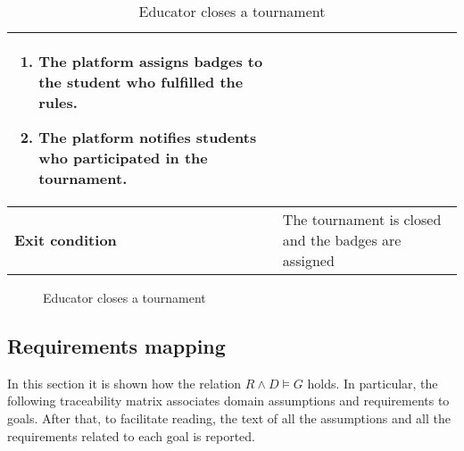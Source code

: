 \begin{enumerate}[label=\textbf{UC\arabic*}:,ref=UC\arabic*,leftmargin=1.3cm]
{\begin{table}[H]
\begin{tabular}{|l|p{11.9cm}|}
\begin{enumerate}[label=\arabic*.]
                              \item The platform assigns badges to the student who fulfilled the rules.
                              \item The platform notifies students who participated in the tournament.
                        \end{enumerate} \\\hline
                        \textbf{Exit condition}  & The tournament is closed and the badges are assigned       \\\hline
                  \end{tabular}
                  \caption{Educator closes a tournament   }
                  \label{table:Educator closes a tournament   }
            \end{table}
            \begin{figure}[H]
                  \centering
                  \caption{Educator closes a tournament   }
                  \label{fig:Educator closes a tournament   }
            \end{figure}
      }
\end{enumerate}
\subsection{Requirements mapping}
In this section it is shown how the relation $R\land D \models G$ holds.
In particular, the following traceability matrix associates domain assumptions and requirements to goals.
After that, to facilitate reading, the text of all the assumptions and all the requirements related to each goal is reported.

